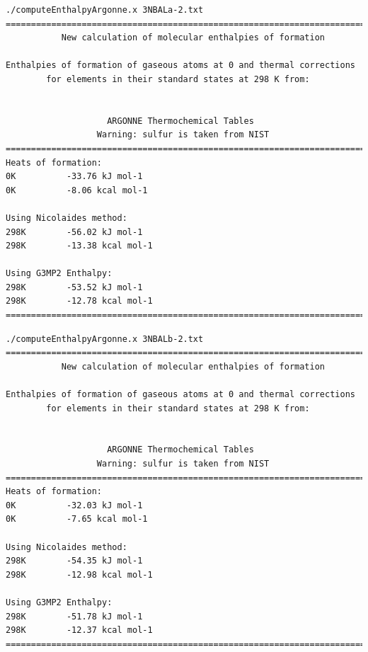 \newpage

\begin{lstlisting}[caption = Output de 3NBALa-2.txt en EnthalpyArgonne]
./computeEnthalpyArgonne.x 3NBALa-2.txt
========================================================================
           New calculation of molecular enthalpies of formation                               
                                                                                                   
Enthalpies of formation of gaseous atoms at 0 and thermal corrections 
        for elements in their standard states at 298 K from:
                                                                                                                  
          
                    ARGONNE Thermochemical Tables                                    
                  Warning: sulfur is taken from NIST                                                                                                       
========================================================================
Heats of formation:
0K          -33.76 kJ mol-1
0K          -8.06 kcal mol-1

Using Nicolaides method:
298K        -56.02 kJ mol-1
298K        -13.38 kcal mol-1

Using G3MP2 Enthalpy:
298K        -53.52 kJ mol-1
298K        -12.78 kcal mol-1
========================================================================
\end{lstlisting}

\newpage

\begin{lstlisting}[caption = Output de 3NBALb-2.txt en EnthalpyArgonne]
./computeEnthalpyArgonne.x 3NBALb-2.txt
========================================================================
           New calculation of molecular enthalpies of formation                               
                                                                                                   
Enthalpies of formation of gaseous atoms at 0 and thermal corrections 
        for elements in their standard states at 298 K from:
                                                                                                                  
          
                    ARGONNE Thermochemical Tables                                    
                  Warning: sulfur is taken from NIST                                                                                                       
========================================================================
Heats of formation:
0K          -32.03 kJ mol-1
0K          -7.65 kcal mol-1

Using Nicolaides method:
298K        -54.35 kJ mol-1
298K        -12.98 kcal mol-1

Using G3MP2 Enthalpy:
298K        -51.78 kJ mol-1
298K        -12.37 kcal mol-1
========================================================================
\end{lstlisting}

